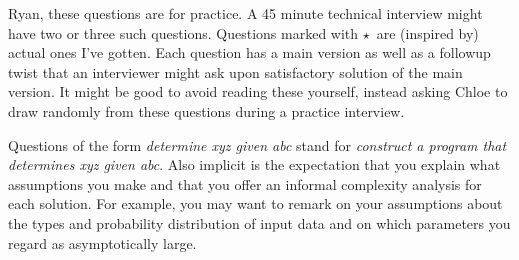 \documentclass{article}
\newcommand{\real}{{\color{red!75}$\star$\ }}
\begin{document}
    Ryan, these questions are for practice.  A 45 minute technical interview
    might have two or three such questions.  Questions marked with \real are
    (inspired by) actual ones I've gotten.  Each question has a main version as
    well as a followup twist that an interviewer might ask upon satisfactory
    solution of the main version.  It might be good to avoid reading these
    yourself, instead asking Chloe to draw randomly from these questions during
    a practice interview.

    Questions of the form \emph{determine xyz given abc} stand for
    \emph{construct a program that determines xyz given abc}.  Also implicit is
    the expectation that you explain what assumptions you make and that you
    offer an informal complexity analysis for each solution.  For example, you
    may want to remark on your assumptions about the types and probability
    distribution of input data and on which parameters you regard as
    asymptotically large.

\end{document}
